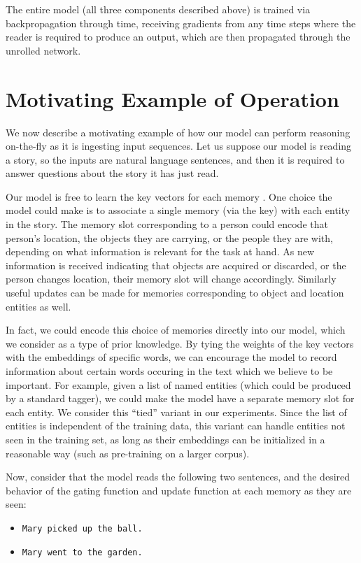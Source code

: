 \documentclass{article} \usepackage{iclr2016_conference,times}
\begin{document}
The entire model (all three components described above) is trained via backpropagation through time, receiving gradients from any time steps where the reader is required to produce an output, which are then propagated through the unrolled network.


\section{Motivating Example of Operation}

We now describe a motivating example of how our model
can perform reasoning on-the-fly as it is ingesting input sequences.
Let us suppose our model is reading a story, so the inputs are natural language sentences,
 and then it is required to answer questions about the story it has just read.

Our model is free to learn the key vectors  for each memory .
One choice the model could make is to associate a single memory (via the key) with each entity
in the story.
The memory slot corresponding to a person could encode that person's location, the objects they are carrying, or the people they are with, depending on what information is relevant for the task at hand. 
As new information is received indicating that objects are acquired or discarded,
 or the person changes location, their memory slot will change accordingly. Similarly useful updates
can be made for memories corresponding to object and location entities as well.

In fact, we could encode this choice of memories directly 
into our model, which we consider as a type of prior
knowledge.  
By tying the weights of the key vectors with the embeddings of specific words, we can encourage the model to record information about certain words occuring in the text which we believe to be important.
For example, given a list of named entities (which could be produced by a standard 
tagger), we could make the model have a separate memory slot for each entity.
We consider this ``tied'' variant in our experiments. 
Since the list of entities is independent of the training data, this variant can handle entities not seen in the training set, as long as their embeddings can be initialized in a reasonable way (such as pre-training on a larger corpus).

Now, consider that the model reads the following two sentences,
and the desired 
behavior of the gating function and update function at each memory as they are seen:

\begin{itemize}
\item \texttt{Mary picked up the ball.}
\item \texttt{Mary went to the garden.}
\end{itemize}
\end{document}
